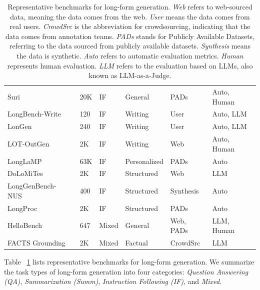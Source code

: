 \documentclass[11pt, a4paper, logo, copyright, nonumbering]{map}
\begin{document}
\begin{table}[!htp]
\begin{tabular}{llllll}
    Suri~\citep{pham2024suri} & 20K & IF & General & PADs & Auto, Human \\
    LongBench-Write~\citep{bai2024longwriter} & 120 & IF & Writing  & User & Auto, LLM \\
    LonGen~\citep{quan2024language} & 240 & IF & Writing & User & Auto, LLM \\
    LOT-OutGen~\citep{guan2022lot} & 2K & IF & Writing & Web & Auto, Human \\
    LongLaMP~\citep{kumar2024longlamp} & 63K & IF & Personalized & PADs & Auto \\
    DoLoMiTes~\citep{malaviya2024dolomites} & 2K & IF & Structured & Web & LLM \\
    LongGenBench-NUS~\citep{wu2024longgenbench} & 400 & IF & Structured & Synthesis & Auto \\
    LongProc~\citep{ye2025longproc} & 2K & IF & Structured & PADs & Auto \\
    HelloBench~\citep{que2024hellobench} & 647 & Mixed & General & Web, PADs & LLM, Human\\
    FACTS Grounding~\citep{jacovi2025facts} & 2K & Mixed & Factual & CrowdSrc & LLM \\
    \bottomrule
    \end{tabular}
    \caption{Representative benchmarks for long-form generation. \textit{Web} refers to web-sourced data, meaning the data comes from the web. \textit{User} means the data comes from real users. \textit{CrowdSrc} is the abbreviation for crowdsourcing, indicating that the data comes from annotation teams. \textit{PADs} stands for Publicly Available Datasets, referring to the data sourced from publicly available datasets. \textit{Synthesis} means the data is synthetic. \textit{Auto} refers to automatic evaluation metrics. \textit{Human} represents human evaluation. \textit{LLM} refers to the evaluation based on LLMs, also known as LLM-as-a-Judge.}
    \label{tab:long-form-bench}
\end{table}

Table ~\ref{tab:long-form-bench} lists representative benchmarks for long-form generation.
We summarize the task types of long-form generation into four categories: \textit{Question Answering (QA)}, \textit{Summarization (Summ)}, \textit{Instruction Following (IF)}, and \textit{Mixed}.
\end{document}
